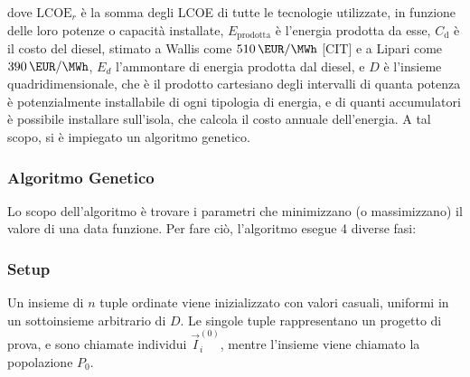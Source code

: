 \documentclass[fleqn,10pt]{SelfArx} %
\begin{document}
dove $\text{LCOE}_r$ è la somma degli LCOE di tutte le tecnologie utilizzate, in funzione delle loro potenze o capacità installate, $E_\text{prodotta}$ è l'energia prodotta da esse, $C_\text{d}$ è il costo del diesel, stimato a Wallis come $\SI{510}{\EUR\per\MWh}$ [CIT] e a Lipari come $\SI{390}{\EUR\per\MWh}$, $E_d$ l'ammontare di energia prodotta dal diesel, e $D$ è l'insieme quadridimensionale, che è il prodotto cartesiano degli intervalli di quanta potenza è potenzialmente installabile di ogni tipologia di energia, e di quanti accumulatori è possibile installare sull'isola, che calcola il costo annuale dell'energia.
A tal scopo, si è impiegato un algoritmo genetico.
\subsubsection{Algoritmo Genetico}
Lo scopo dell'algoritmo è trovare i parametri che minimizzano (o massimizzano) il valore di una data funzione.
Per fare ciò, l'algoritmo esegue 4 diverse fasi: \\

\newcommand{\vI}{\vec{I}}

\subsubsection{Setup}
Un insieme di \(n\) tuple ordinate viene inizializzato con valori casuali, uniformi in un sottoinsieme arbitrario di \(D\). 
Le singole tuple rappresentano un progetto di prova, e sono chiamate individui \(\vI^{(0)}_i\), mentre l'insieme viene chiamato la popolazione \(P_0\).
\end{document}
